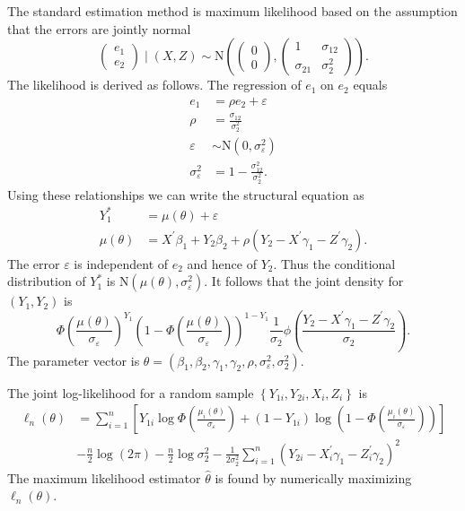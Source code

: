 \documentclass[10pt]{article}
\begin{document}
The standard estimation method is maximum likelihood based on the assumption that the errors are jointly normal
$$
\left(\begin{array}{l}
e_{1} \\
e_{2}
\end{array}\right) \mid(X, Z) \sim \mathrm{N}\left(\left(\begin{array}{l}
0 \\
0
\end{array}\right),\left(\begin{array}{cc}
1 & \sigma_{12} \\
\sigma_{21} & \sigma_{2}^{2}
\end{array}\right)\right) .
$$
The likelihood is derived as follows. The regression of $e_{1}$ on $e_{2}$ equals
$$
\begin{aligned}
e_{1} &=\rho e_{2}+\varepsilon \\
\rho &=\frac{\sigma_{12}}{\sigma_{2}^{2}} \\
\varepsilon & \sim \mathrm{N}\left(0, \sigma_{\varepsilon}^{2}\right) \\
\sigma_{\varepsilon}^{2} &=1-\frac{\sigma_{12}^{2}}{\sigma_{2}^{2}} .
\end{aligned}
$$
Using these relationships we can write the structural equation as
$$
\begin{aligned}
Y_{1}^{*} &=\mu(\theta)+\varepsilon \\
\mu(\theta) &=X^{\prime} \beta_{1}+Y_{2} \beta_{2}+\rho\left(Y_{2}-X^{\prime} \gamma_{1}-Z^{\prime} \gamma_{2}\right) .
\end{aligned}
$$
The error $\varepsilon$ is independent of $e_{2}$ and hence of $Y_{2}$. Thus the conditional distribution of $Y_{1}^{*}$ is $\mathrm{N}\left(\mu(\theta), \sigma_{\varepsilon}^{2}\right)$. It follows that the joint density for $\left(Y_{1}, Y_{2}\right)$ is
$$
\Phi\left(\frac{\mu(\theta)}{\sigma_{\varepsilon}}\right)^{Y_{1}}\left(1-\Phi\left(\frac{\mu(\theta)}{\sigma_{\varepsilon}}\right)\right)^{1-Y_{1}} \frac{1}{\sigma_{2}} \phi\left(\frac{Y_{2}-X^{\prime} \gamma_{1}-Z^{\prime} \gamma_{2}}{\sigma_{2}}\right) .
$$
The parameter vector is $\theta=\left(\beta_{1}, \beta_{2}, \gamma_{1}, \gamma_{2}, \rho, \sigma_{\varepsilon}^{2}, \sigma_{2}^{2}\right)$.

The joint log-likelihood for a random sample $\left\{Y_{1 i}, Y_{2 i}, X_{i}, Z_{i}\right\}$ is
$$
\begin{aligned}
\ell_{n}(\theta) &=\sum_{i=1}^{n}\left[Y_{1 i} \log \Phi\left(\frac{\mu_{i}(\theta)}{\sigma_{\varepsilon}}\right)+\left(1-Y_{1 i}\right) \log \left(1-\Phi\left(\frac{\mu_{i}(\theta)}{\sigma_{\varepsilon}}\right)\right)\right] \\
&-\frac{n}{2} \log (2 \pi)-\frac{n}{2} \log \sigma_{2}^{2}-\frac{1}{2 \sigma_{2}^{2}} \sum_{i=1}^{n}\left(Y_{2 i}-X_{i}^{\prime} \gamma_{1}-Z_{i}^{\prime} \gamma_{2}\right)^{2}
\end{aligned}
$$
The maximum likelihood estimator $\widehat{\theta}$ is found by numerically maximizing $\ell_{n}(\theta)$.
\end{document}
